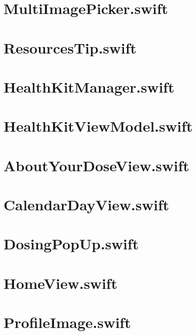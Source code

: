 \section{MultiImagePicker.swift}


\section{ResourcesTip.swift}


\section{HealthKitManager.swift}


\section{HealthKitViewModel.swift}


\section{AboutYourDoseView.swift}


\section{CalendarDayView.swift}


\section{DosingPopUp.swift}


\section{HomeView.swift}


\section{ProfileImage.swift}


